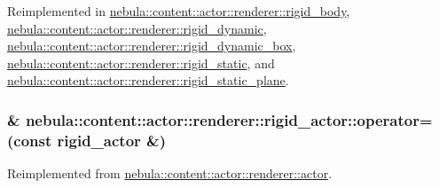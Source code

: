 Reimplemented in \hyperlink{classnebula_1_1content_1_1actor_1_1renderer_1_1rigid__body_afd1175cdc7b35a918db4bd89c59463f0}{nebula::content::actor::renderer::rigid\_\-body}, \hyperlink{classnebula_1_1content_1_1actor_1_1renderer_1_1rigid__dynamic_ab957f8a465493d2a9d7a2f0015d4a5ea}{nebula::content::actor::renderer::rigid\_\-dynamic}, \hyperlink{classnebula_1_1content_1_1actor_1_1renderer_1_1rigid__dynamic__box_a73d0f162b01df6a9f025d51477d37789}{nebula::content::actor::renderer::rigid\_\-dynamic\_\-box}, \hyperlink{classnebula_1_1content_1_1actor_1_1renderer_1_1rigid__static_a44a1c6a982296b5f1d4c0919c2c4ecf1}{nebula::content::actor::renderer::rigid\_\-static}, and \hyperlink{classnebula_1_1content_1_1actor_1_1renderer_1_1rigid__static__plane_aae78beb9e7389ea77d6a8103ec388972}{nebula::content::actor::renderer::rigid\_\-static\_\-plane}.\hypertarget{classnebula_1_1content_1_1actor_1_1renderer_1_1rigid__actor_a595700dbe653ae7c64b01ad332065725}{
\subsubsection[{operator=}]{\& nebula::content::actor::renderer::rigid\_\-actor::operator= (const {\bf rigid\_\-actor} \&)}}
\label{classnebula_1_1content_1_1actor_1_1renderer_1_1rigid__actor_a595700dbe653ae7c64b01ad332065725}


Reimplemented from \hyperlink{classnebula_1_1content_1_1actor_1_1renderer_1_1actor_ac6d5635a4fcdbf531ff46b4c9f9623c7}{nebula::content::actor::renderer::actor}.

